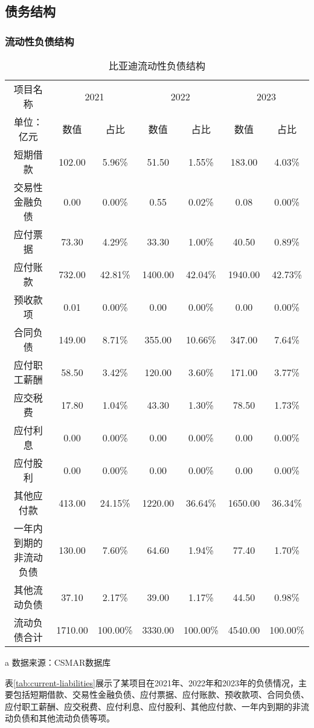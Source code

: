 \subsection{债务结构}
\subsubsection{流动性负债结构}
\begin{table}
  \centering
  \begin{threeparttable}[c]
    \caption{比亚迪流动性负债结构}
    \label{tab:current-liabilities}
    \begin{tabular}{ccccccc}
      \toprule
      项目名称 & \multicolumn{2}{c}{2021} & \multicolumn{2}{c}{2022} & \multicolumn{2}{c}{2023} \\ 
        单位：亿元 & 数值 & 占比 & 数值 & 占比 & 数值 & 占比 \\ 
      \midrule
        短期借款 & 102.00  & 5.96\% & 51.50  & 1.55\% & 183.00  & 4.03\% \\ 
        交易性金融负债 & 0.00  & 0.00\% & 0.55  & 0.02\% & 0.08  & 0.00\% \\ 
        应付票据 & 73.30  & 4.29\% & 33.30  & 1.00\% & 40.50  & 0.89\% \\ 
        应付账款 & 732.00  & 42.81\% & 1400.00  & 42.04\% & 1940.00  & 42.73\% \\ 
        预收款项 & 0.01  & 0.00\% & 0.00  & 0.00\% & 0.00  & 0.00\% \\ 
        合同负债 & 149.00  & 8.71\% & 355.00  & 10.66\% & 347.00  & 7.64\% \\ 
        应付职工薪酬 & 58.50  & 3.42\% & 120.00  & 3.60\% & 171.00  & 3.77\% \\ 
        应交税费 & 17.80  & 1.04\% & 43.30  & 1.30\% & 78.50  & 1.73\% \\ 
        应付利息 & 0.00  & 0.00\% & 0.00  & 0.00\% & 0.00  & 0.00\% \\ 
        应付股利 & 0.00  & 0.00\% & 0.00  & 0.00\% & 0.00  & 0.00\% \\ 
        其他应付款 & 413.00  & 24.15\% & 1220.00  & 36.64\% & 1650.00  & 36.34\% \\ 
        一年内到期的非流动负债 & 130.00  & 7.60\% & 64.60  & 1.94\% & 77.40  & 1.70\% \\ 
        其他流动负债 & 37.10  & 2.17\% & 39.00  & 1.17\% & 44.50  & 0.98\% \\ 
        流动负债合计 & 1710.00  & 100.00\% & 3330.00  & 100.00\% & 4540.00  & 100.00\% \\ 
      \bottomrule
    \end{tabular}
    \begin{tablenotes}
      \item [a] 数据来源：CSMAR数据库
    \end{tablenotes}
  \end{threeparttable}
\end{table}
表\eqref{tab:current-liabilities}展示了某项目在2021年、2022年和2023年的负债情况，主要包括短期借款、交易性金融负债、应付票据、应付账款、预收款项、合同负债、应付职工薪酬、应交税费、应付利息、应付股利、其他应付款、一年内到期的非流动负债和其他流动负债等项。

